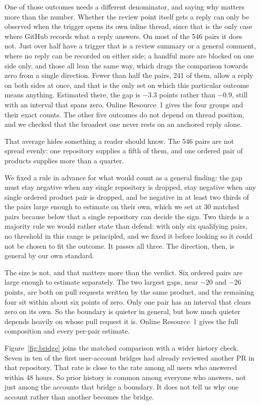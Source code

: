 \documentclass[lineno,pdflatex,sn-basic]{sn-jnl}
\begin{document}
One of those outcomes needs a different denominator, and saying why matters more
than the number. Whether the review point itself gets a reply can only be
observed when the trigger opens its own inline thread, since that is the only
case where GitHub records what a reply answers. On most of the 546 pairs it does
not. Just over half have a trigger that is a review summary or a general comment,
where no reply can be recorded on either side; a handful more are blocked on one
side only, and those all lean the same way, which drags the comparison towards
zero from a single direction. Fewer than half the pairs, 241 of them, allow a
reply on both sides at once, and that is the only set on which this particular
outcome means anything. Estimated there, the gap is $-3.3$ points rather than
$-0.9$, still with an interval that spans zero. Online Resource~1 gives the four
groups and their exact counts. The
other five outcomes do not depend on thread position, and we checked that the
broadest one never rests on an anchored reply alone.

That average hides something a reader should know. The 546 pairs are not spread
evenly: one repository supplies a fifth of them, and one ordered pair of products
supplies more than a quarter.

We fixed a rule in advance for what would count as a general finding: the gap must
stay negative when any single repository is dropped, stay negative when any single
ordered product pair is dropped, and be negative in at least two thirds of the
pairs large enough to estimate on their own, which we set at 30 matched pairs
because below that a single repository can decide the sign.
Two thirds is a majority rule we would rather state than defend: with only six
qualifying pairs, no threshold in this range is principled, and we fixed it
before looking so it could not be chosen to fit the outcome. It passes all
three. The direction,
then, is general by our own standard.

The size is not, and that matters more than the verdict. Six ordered pairs are
large enough to estimate separately. The two largest gaps, near $-20$ and $-26$
points, are both on pull requests written by the same product, and the remaining
four sit within about six points of zero. Only one pair has an interval that
clears zero on its own. So the boundary is quieter in general, but how much
quieter depends heavily on whose pull request it is. Online Resource~1 gives the
full composition and every per-pair estimate.

Figure~\ref{fig:bridge} joins the matched comparison with a wider history
check. Seven in ten of the first user-account bridges had already reviewed
another PR in that repository. That rate is close to the rate among all users
who answered within 48 hours. So prior history is common among everyone who
answers, not just among the accounts that bridge a boundary. It does not tell us why one account rather than another
becomes the bridge.
\end{document}
